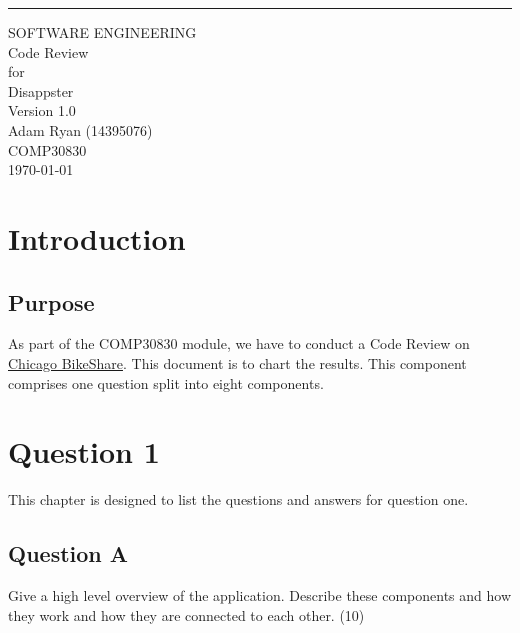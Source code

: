 \documentclass{scrreprt}
\date{}
\def\myversion{1.0 }
\begin{document}
\begin{flushright}
    \rule{16cm}{5pt}\vskip1cm
    \begin{bfseries}
        \Huge{SOFTWARE ENGINEERING \\ Code Review}\\
        \vspace{1.9cm}
        for\\
        \vspace{1.9cm}
        Disappster\\
        \vspace{1.9cm}
        \LARGE{Version \myversion}\\
        \vspace{1.9cm}
        Adam Ryan (14395076)\\
        \vspace{1.9cm}
        COMP30830\\
        \vspace{1.9cm}
        \today\\
    \end{bfseries}
\end{flushright}

\tableofcontents

\chapter{Introduction}\label{Intro}

\section{Purpose}\label{Purpose}
As part of the COMP30830 module, we have to conduct a Code Review on \href{https://github.com/dssg/bikeshare.git}{Chicago BikeShare}. This document is to chart the results. This component comprises one question split into eight components.

\pagebreak
\chapter{Question 1}\label{Q1}
This chapter is designed to list the questions and answers for question one.

\section{Question A}\label{QA}
Give a high level overview of the application. Describe these components and how they work and how they are connected to each other.  (10)\\
\\
\end{document}
